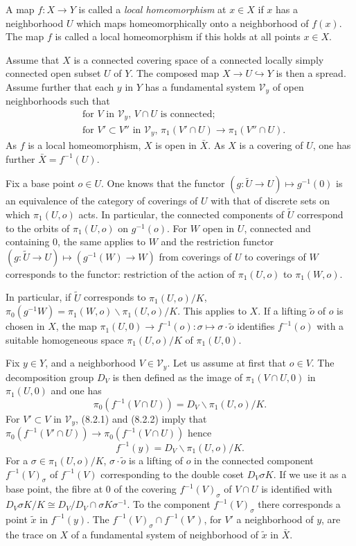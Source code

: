 \documentclass[12pt,a4paper]{article}
\theoremstyle{plain}
\theoremstyle{definition}
\theoremstyle{remark}
\numberwithin{equation}{section}
\begin{document}
A map $f: X \to Y$ is called a \emph{local homeomorphism} at $x \in X$ if $x$ has a neighborhood $U$ which maps homeomorphically onto a neighborhood of $f(x)$. The map $f$ is called a local homeomorphism if this holds at all points $x \in X$.

Assume that $X$ is a connected covering space of a connected locally simply connected open subset $U$ of $Y$. The composed map $X \to U \hookrightarrow Y$ is then a spread. Assume further that each $y$ in $Y$ has a fundamental system $\mathscr{V}_y$ of open neighborhoods such that
\begin{align}
&\text{for $V$ in $\mathscr{V}_y$, $V \cap U$ is connected;} \label{eq:8.2.1} \\
&\text{for $V' \subset V''$ in $\mathscr{V}_y$, $\pi_1(V' \cap U) \to \pi_1(V'' \cap U)$.} \label{eq:8.2.2}
\end{align}
As $f$ is a local homeomorphism, $X$ is open in $\bar{X}$. As $X$ is a covering of $U$, one has further $\bar{X} = f^{-1}(U)$.

Fix a base point $o \in U$. One knows that the functor $(g: \widetilde{U} \to U) \mapsto g^{-1}(0)$ is an equivalence of the category of coverings of $U$ with that of discrete sets on which $\pi_1(U, o)$ acts. In particular, the connected components of $\widetilde{U}$ correspond to the orbits of $\pi_1(U, o)$ on $g^{-1}(o)$. For $W$ open in $U$, connected and containing $0$, the same applies to $W$ and the restriction functor $(g: \widetilde{U} \to U) \mapsto (g^{-1}(W) \to W)$ from coverings of $U$ to coverings of $W$ corresponds to the functor: restriction of the action of $\pi_1(U, o)$ to $\pi_1(W, o)$.

In particular, if $\widetilde{U}$ corresponds to $\pi_1(U, o)/K$, $\pi_0(g^{-1}W) = \pi_1(W, o) \backslash \pi_1(U, o) / K$. This applies to $X$. If a lifting $\tilde{o}$ of $o$ is chosen in $X$, the map $\pi_1(U, 0) \to f^{-1}(o): \sigma \mapsto \sigma \cdot \tilde{o}$ identifies $f^{-1}(o)$ with a suitable homogeneous space $\pi_1(U, o)/K$ of $\pi_1(U, 0)$.

Fix $y \in Y$, and a neighborhood $V \in \mathscr{V}_y$. Let us assume at first that $o \in V$. The decomposition group $D_V$ is then defined as the image of $\pi_1(V \cap U, 0)$ in $\pi_1(U, 0)$ and one has
\[
\pi_0(f^{-1}(V \cap U)) = D_V \backslash \pi_1(U, o) / K.
\]
For $V' \subset V$ in $\mathscr{V}_y$, (8.2.1) and (8.2.2) imply that $\pi_0(f^{-1}(V' \cap U)) \to \pi_0(f^{-1}(V \cap U))$ hence
\begin{equation}\label{eq:8.2.3}
f^{-1}(y) = D_V \backslash \pi_1(U, o) / K.
\end{equation}
For a $\sigma \in \pi_1(U, o)/K$, $\sigma \cdot \tilde{o}$ is a lifting of $o$ in the connected component $f^{-1}(V)_\sigma$ of $f^{-1}(V)$ corresponding to the double coset $D_V \sigma K$. If we use it as a base point, the fibre at $0$ of the covering $f^{-1}(V)_\sigma$ of $V \cap U$ is identified with $D_V \sigma K / K \cong D_V / D_V \cap \sigma K \sigma^{-1}$. To the component $f^{-1}(V)_\sigma$ there corresponds a point $\tilde{x}$ in $f^{-1}(y)$. The $f^{-1}(V)_\sigma \cap f^{-1}(V')$, for $V'$ a neighborhood of $y$, are the trace on $X$ of a fundamental system of neighborhood of $\tilde{x}$ in $\bar{X}$.
\end{document}
